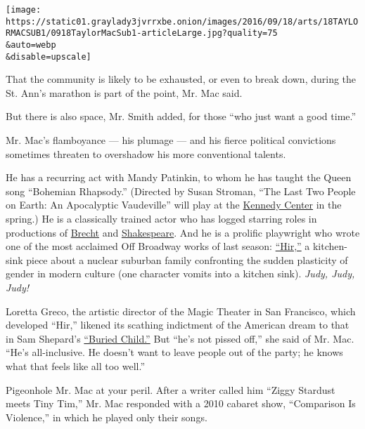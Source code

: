 \texttt{[image: https://static01.graylady3jvrrxbe.onion/images/2016/09/18/arts/18TAYLORMACSUB1/0918TaylorMacSub1-articleLarge.jpg?quality=75\\\&auto=webp\\\&disable=upscale]}

That the community is likely to be exhausted, or even to break down,
during the St. Ann's marathon is part of the point, Mr. Mac said.

But there is also space, Mr. Smith added, for those ``who just want a
good time.''

Mr. Mac's flamboyance --- his plumage --- and his fierce political
convictions sometimes threaten to overshadow his more conventional
talents.

He has a recurring act with Mandy Patinkin, to whom he has taught the
Queen song ``Bohemian Rhapsody.'' (Directed by Susan Stroman, ``The Last
Two People on Earth: An Apocalyptic Vaudeville'' will play at the
\href{https://www.kennedy-center.org/calendar/event/TRTSM}{Kennedy
Center} in the spring.) He is a classically trained actor who has logged
starring roles in productions of
\href{http://www.nytimes3xbfgragh.onion/2013/02/09/theater/reviews/good-person-of-szechwan-with-taylor-mac-at-la-mama.html?_r=0}{Brecht}
and
\href{http://www.nytimes3xbfgragh.onion/2012/04/30/theater/reviews/a-midsummer-nights-dream-at-classic-stage-company.html}{Shakespeare}.
And he is a prolific playwright who wrote one of the most acclaimed Off
Broadway works of last season:
\href{http://www.nytimes3xbfgragh.onion/2015/11/09/theater/review-hir-sorts-through-a-family-in-transition.html}{``Hir,''}
a kitchen-sink piece about a nuclear suburban family confronting the
sudden plasticity of gender in modern culture (one character vomits into
a kitchen sink). \emph{Judy, Judy, Judy!}

Loretta Greco, the artistic director of the Magic Theater in San
Francisco, which developed ``Hir,'' likened its scathing indictment of
the American dream to that in Sam Shepard's
\href{http://www.nytimes3xbfgragh.onion/2016/02/18/theater/review-in-shepards-buried-child-a-father-and-family-dissolve-into-darkness.html}{``Buried
Child.''} But ``he's not pissed off,'' she said of Mr. Mac. ``He's
all-inclusive. He doesn't want to leave people out of the party; he
knows what that feels like all too well.''

Pigeonhole Mr. Mac at your peril. After a writer called him ``Ziggy
Stardust meets Tiny Tim,'' Mr. Mac responded with a 2010 cabaret show,
``Comparison Is Violence,'' in which he played only their songs.


